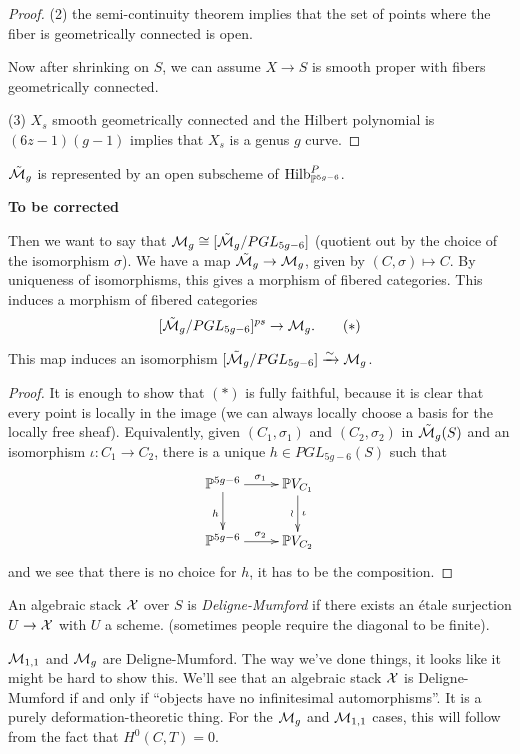 \begin{example}
\begin{proof}
     (2) the semi-continuity theorem implies that the set of points where the fiber is
     geometrically connected is open.

     Now after shrinking on $S$, we can assume $X\to S$ is smooth proper with
     fibers geometrically connected.

     (3) $X_s$ smooth geometrically connected and the Hilbert polynomial is $(6z-1)(g-1)$
     implies that $X_s$ is a genus $g$ curve.
   \end{proof}
   \begin{corollary}
     $\tilde {\mathcal{M}}_g$ is represented by an open subscheme of $\operatorname{Hilb}^P_{\mathbb{P}^{5g-6}}$.
   \end{corollary}
   \textbf{To be corrected}

   Then we want to say that $\mathcal{M}_g\cong [\tilde{\mathcal{M}}_g/PGL_{5g-6}]$ (quotient out by the
   choice of the isomorphism $\sigma$). We have a map $\tilde {\mathcal{M}}_g\to \mathcal{M}_g$, given by
   $(C,\sigma)\mapsto C$. By uniqueness of isomorphisms, this gives a morphism of fibered
   categories. This induces a morphism of fibered categories
   \[
   [\tilde
   {\mathcal{M}}_g/PGL_{5g-6}]^{ps}\to \mathcal{M}_g.\tag{$\ast$}
   \]
   \begin{lemma}
     This map induces an isomorphism $[\tilde {\mathcal{M}}_g/PGL_{5g-6}]\xrightarrow\sim \mathcal{M}_g$.
   \end{lemma}
   \begin{proof}
     It is enough to show that $(\ast)$ is fully faithful, because it is clear that every
     point is locally in the image (we can always locally choose a basis for the locally
     free sheaf). Equivalently, given $(C_1,\sigma_1)$ and $(C_2,\sigma_2)$ in $\tilde
     {\mathcal{M}}_g(S)$ and an isomorphism $\iota:C_1\to C_2$, there is a unique $h\in PGL_{5g-6}(S)$
     such that
     \[\xymatrix{
      \PP^{5g-6} \ar[d]_h \ar[r]^{\sigma_1} & \PP V_{C_1} \ar[d]_\wr^\iota\\
      \PP^{5g-6} \ar[r]^{\sigma_2} & \PP V_{C_2}
     }\]
     and we see that there is no choice for $h$, it has to be the composition.
   \end{proof}
 \end{example}

 \begin{definition}
   An algebraic stack $\mathcal{X}$ over $S$ is \emph{Deligne-Mumford} if there exists an \'etale
   surjection $U\to \mathcal{X}$ with $U$ a scheme. (sometimes people require the diagonal to be
   finite).
 \end{definition}
 \begin{remark}
   $\mathcal{M}_{1,1}$ and $\mathcal{M}_g$ are Deligne-Mumford. The way we've done things, it looks like it
   might be hard to show this. We'll see that an algebraic stack $\mathcal{X}$ is Deligne-Mumford
   if and only if ``objects have no infinitesimal automorphisms''. It is a purely
   deformation-theoretic thing. For the $\mathcal{M}_g$ and $\mathcal{M}_{1,1}$ cases, this will follow
   from the fact that $H^0(C,T)=0$.
 \end{remark}

